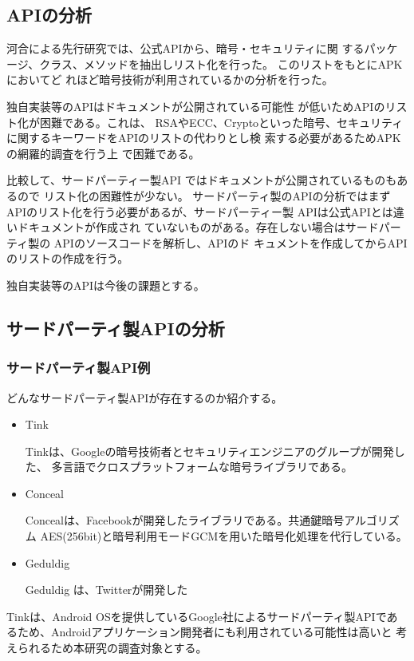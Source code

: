 \subsection{APIの分析}
河合による先行研究では、公式APIから、暗号・セキュリティに関
するパッケージ、クラス、メソッドを抽出しリスト化を行った。
このリストをもとにAPKにおいてど
れほど暗号技術が利用されているかの分析を行った。

独自実装等のAPIはドキュメントが公開されている可能性
が低いためAPIのリスト化が困難である。これは、
RSAやECC、Cryptoといった暗号、セキュリティ
に関するキーワードをAPIのリストの代わりとし検
索する必要があるためAPKの網羅的調査を行う上
で困難である。

比較して、サードパーティー製API
ではドキュメントが公開されているものもあるので
リスト化の困難性が少ない。
サードパーティ製のAPIの分析ではまずAPIのリスト化を行う必要があるが、サードパーティー製
APIは公式APIとは違いドキュメントが作成され
ていないものがある。存在しない場合はサードパー
ティ製の APIのソースコードを解析し、APIのド
キュメントを作成してからAPIのリストの作成を行う。

独自実装等のAPIは今後の課題とする。

\subsection{サードパーティ製APIの分析}

\subsubsection{サードパーティ製API例}
どんなサードパーティ製APIが存在するのか紹介する。
\begin{itemize}
\item Tink　

Tinkは、Googleの暗号技術者とセキュリティエンジニアのグループが開発した、
多言語でクロスプラットフォームな暗号ライブラリである。

\item Conceal

Concealは、Facebookが開発したライブラリである。共通鍵暗号アルゴリズム AES(256bit)と暗号利用モードGCMを用いた暗号化処理を代行している。

\item Geduldig 

 
Geduldig は、Twitterが開発した
\end{itemize}
Tinkは、Android OSを提供しているGoogle社によるサードパーティ製APIであるため、Androidアプリケーション開発者にも利用されている可能性は高いと
考えられるため本研究の調査対象とする。


